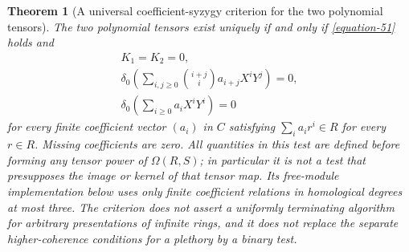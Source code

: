 \documentclass[11pt,a4paper]{article}
\newtheorem{theorem}{Theorem}[section]
\theoremstyle{definition}
\begin{document}
\begin{theorem}[A universal coefficient-syzygy criterion for the two polynomial tensors]
The two polynomial tensors exist uniquely if and only if
\eqref{equation-51} holds and
\begin{equation}
\begin{gathered}
                         K_1=K_2=0,\\
 \delta_0\left(\sum_{i,j\ge0}\binom{i+j}{i}
                        a_{i+j}X^iY^j\right)=0,\\
 \delta_0\left(\sum_{i\ge0}a_iX^iY^i\right)=0            \label{equation-56}
\end{gathered}
\end{equation}
for every finite coefficient vector $(a_i)$ in $C$ satisfying
$\sum_i a_ir^i\in R$ for every $r\in R$. Missing coefficients are zero.
All quantities in this test are defined before forming any tensor
power of $\Omega(R,S)$; in particular it is not a test that presupposes
the image or kernel of that tensor map. Its free-module implementation
below uses only finite coefficient relations in homological degrees
at most three. The criterion does not assert a uniformly terminating
algorithm for arbitrary presentations of infinite rings, and it
does not replace the separate higher-coherence conditions for a
plethory by a binary test.
\end{theorem}
\end{document}
